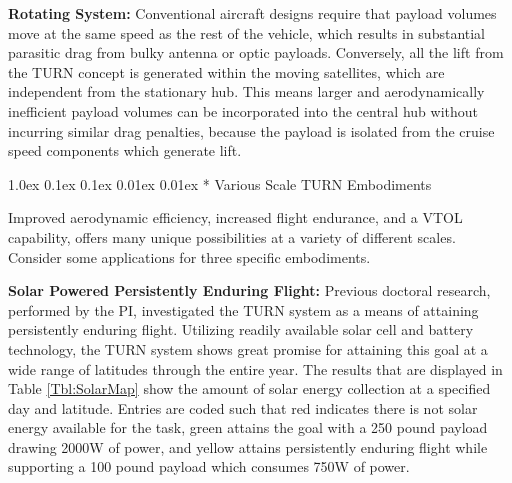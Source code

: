 \documentclass[11pt]{article}
\makeatletter
\renewcommand\subsection{
\@startsection{subsection}{2}{\z@}%
{1.0ex \@plus 0.1ex \@minus 0.1ex}%
{0.01ex \@plus 0.01ex}%
{\normalfont\Large\bfseries}}
\makeatother
\begin{document}
{\color{green} \bf Rotating System:}
Conventional aircraft designs require that payload volumes move at the same speed as the rest of the vehicle, which results in substantial parasitic drag from bulky antenna or optic payloads.  Conversely, all the lift from the TURN concept is generated within the moving satellites, which are independent from the stationary hub.  This means larger and aerodynamically inefficient payload volumes can be incorporated into the central hub without incurring similar drag penalties, because the payload is isolated from the cruise speed components which generate lift.




\subsection*{\color{green} Various Scale TURN Embodiments}

Improved aerodynamic efficiency, increased flight endurance, and a VTOL capability, offers many unique possibilities at a variety of different scales.  Consider some applications for three specific embodiments.


{\color{green} \bf Solar Powered Persistently Enduring Flight:}
Previous doctoral research, performed by the PI, investigated the TURN system as a means of attaining persistently enduring flight.  Utilizing readily available solar cell and battery technology, the TURN system shows great promise for attaining this goal at a wide range of latitudes through the entire year.  The results that are displayed in Table \ref{Tbl:SolarMap} show the amount of solar energy collection at a specified day and latitude.  Entries are coded such that red indicates there is not solar energy available for the task, green attains the goal with a 250 pound payload drawing 2000W of power, and yellow attains persistently enduring flight while supporting a 100 pound payload which consumes 750W of power.
\end{document}
